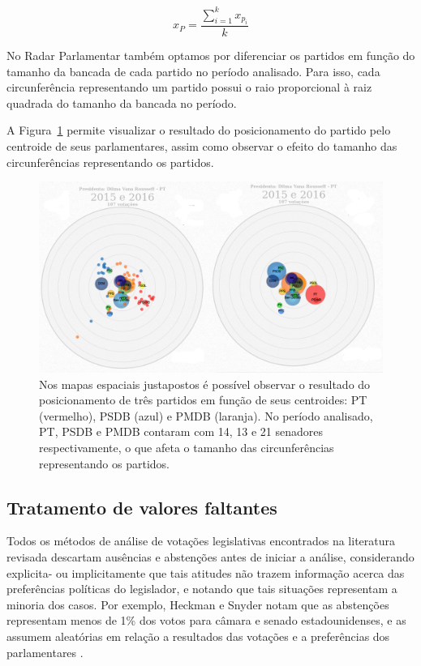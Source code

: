 \documentclass[a4paper, 12pt]{article}
\begin{document}
\begin{equation}
  x_{P} = \frac{\sum_{i=1}^{k}{x_{p_i}}}{k}
  \label{eq:partido-centroide}
\end{equation}

No Radar Parlamentar também optamos por diferenciar os partidos em função do tamanho da bancada de cada partido no período analisado. Para isso, cada circunferência representando um partido possui o raio proporcional à raiz quadrada do tamanho da bancada no período.

A Figura~\ref{fig:centroide} permite visualizar o resultado do posicionamento do partido pelo centroide de seus parlamentares, assim como observar o efeito do tamanho das circunferências representando os partidos.

\begin{figure}[h]
  \centering
  \includegraphics[scale=0.37]{figs/centroide.png}
  \caption{Nos mapas espaciais justapostos é possível observar o resultado do posicionamento de três partidos em função de seus centroides: PT (vermelho), PSDB (azul) e PMDB (laranja). No período analisado, PT, PSDB e PMDB contaram com 14, 13 e 21 senadores respectivamente, o que afeta o tamanho das circunferências representando os partidos.}
  \label{fig:centroide}
\end{figure}

\subsection{Tratamento de valores faltantes}

Todos os métodos de análise de votações legislativas encontrados na literatura revisada descartam ausências e abstenções antes de iniciar a análise, considerando explicita- ou implicitamente que tais atitudes não trazem informação acerca das preferências políticas do legislador, e notando que tais situações representam a minoria dos casos. Por exemplo, Heckman e Snyder notam que as abstenções representam menos de 1\% dos votos para câmara e senado estadounidenses, e as assumem aleatórias em relação a resultados das votações e a preferências dos parlamentares \cite{heckman-snyder1997}.
\end{document}
